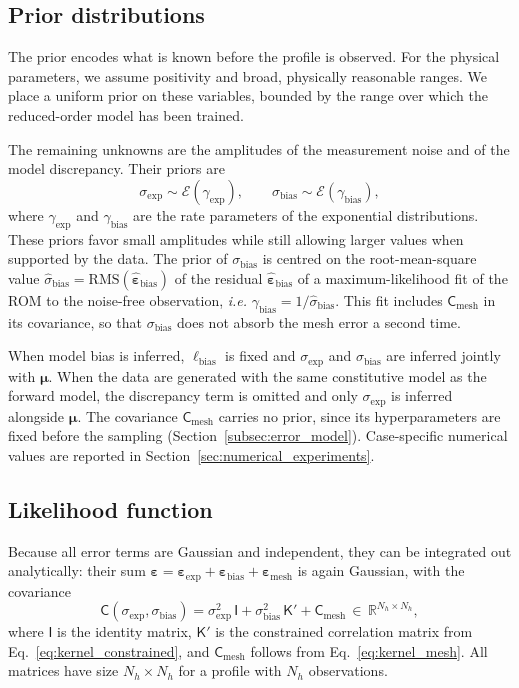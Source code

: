 \documentclass{elsarticle}
\newcommand{\ie}{\emph{i.e.}\xspace}
\renewcommand{\vec}[1]{\boldsymbol{#1}}
\newcommand{\mat}[1]{\mathsf{#1}}
\newcommand{\params}{\boldsymbol{\mu}}
\newcommand{\subexp}{\mathrm{exp}}
\newcommand{\subbias}{\mathrm{bias}}
\newcommand{\submesh}{\mathrm{mesh}}        %
\begin{document}
\subsection{Prior distributions}
\label{subsec:priors}

The prior encodes what is known before the profile is observed. For the
physical parameters, we assume positivity and broad, physically reasonable
ranges. We place a uniform prior on these variables, bounded by the range over
which the reduced-order model has been trained.

The remaining unknowns are the amplitudes of the measurement noise and of the
model discrepancy. Their priors are
\begin{equation}
\sigma_{\subexp}\sim \mathcal{E}(\gamma_{\subexp}),
\qquad
\sigma_{\subbias}\sim \mathcal{E}(\gamma_{\subbias}),
\label{eq:priors_noise}
\end{equation}
where $\gamma_{\subexp}$ and $\gamma_{\subbias}$ are the rate parameters of the
exponential distributions. These priors favor small amplitudes while still
allowing larger values when supported by the data. The prior of
$\sigma_{\subbias}$ is centred on the root-mean-square value
$\hat{\sigma}_{\subbias} = \mathrm{RMS}(\hat{\vec{\varepsilon}}_{\subbias})$ of
the residual $\hat{\vec{\varepsilon}}_{\subbias}$ of a maximum-likelihood fit
of the ROM to the noise-free observation, \ie
$\gamma_{\subbias} = 1/\hat{\sigma}_{\subbias}$. This fit includes
$\mat{C}_{\submesh}$ in its covariance, so that $\sigma_{\subbias}$ does not
absorb the mesh error a second time.

When model bias is inferred, $\ell_{\subbias}$ is fixed and
$\sigma_{\subexp}$ and $\sigma_{\subbias}$ are inferred jointly with
$\params$. When the data are generated with the same constitutive model as the
forward model, the discrepancy term is omitted and only $\sigma_{\subexp}$ is
inferred alongside $\params$. The covariance $\mat{C}_{\submesh}$ carries no
prior, since its hyperparameters are fixed before the sampling
(Section~\ref{subsec:error_model}). Case-specific numerical values
are reported in Section~\ref{sec:numerical_experiments}.

\subsection{Likelihood function}
\label{subsec:likelihood}

Because all error terms are Gaussian and independent, they can be integrated
out analytically: their sum
$\vec{\varepsilon}=\vec{\varepsilon}_{\subexp}+\vec{\varepsilon}_{\subbias}
+\vec{\varepsilon}_{\submesh}$ is again Gaussian, with the covariance
\begin{equation}
\mat{C}(\sigma_{\subexp},\sigma_{\subbias})
= \sigma_{\subexp}^{2}\,\mat{I}
+ \sigma_{\subbias}^{2}\,\mat{K}'
+ \mat{C}_{\submesh}
\,\in\, \mathbb{R}^{N_h\times N_h},
\label{eq:covariance}
\end{equation}
where $\mat{I}$ is the identity matrix, $\mat{K}'$ is the constrained
correlation matrix from Eq.~\eqref{eq:kernel_constrained}, and
$\mat{C}_{\submesh}$ follows from Eq.~\eqref{eq:kernel_mesh}. All matrices have
size $N_h\times N_h$ for a profile with $N_h$ observations.
\end{document}
